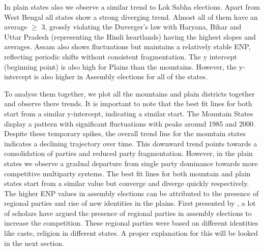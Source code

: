  In plain states also we observe a similar trend to Lok Sabha elections. Apart from West Bengal all states show a strong diverging trend. Almost all of them have an average $\geq$ 3, grossly violating the Duverger's law with Haryana, Bihar and Uttar Pradesh (representing the Hindi heartlands) having the highest slopes and averages.  Assam also shows fluctuations but maintains a relatively stable ENP, reflecting periodic shifts without consistent fragmentation. The y intercept (beginning point) is also high for Plains than the mountains. However, the y-intercept is also higher in Assembly elections for all of the states. 


To analyse them together, we plot all the mountains and plain districts together and observe there trends. It is important to note that the best fit lines for both start from a similar y-intercept, indicating a similar start. The Mountain States display a pattern with significant fluctuations with peaks around 1985 and 2000. Despite these temporary spikes, the overall trend line for the mountain states indicates a declining trajectory over time. This downward trend points towards a consolidation of parties and reduced party fragmentation. However, in the plain states we observe a gradual departure from single party dominance towards more competitive multiparty systems. The best fit lines for both mountain and plain states start from a similar value but converge and diverge quickly respectively. The higher ENP values in assembly elections can be attributed to the presence of regional parties and rise of new identities in the plains. First presented by \citep{lijphart1994}, a lot of scholars have argued the presence of regional parties in assembly elections to increase the competition. These regional parties were based on different identities like caste, religion in different states. A proper explanation for this will be looked in the next section.

